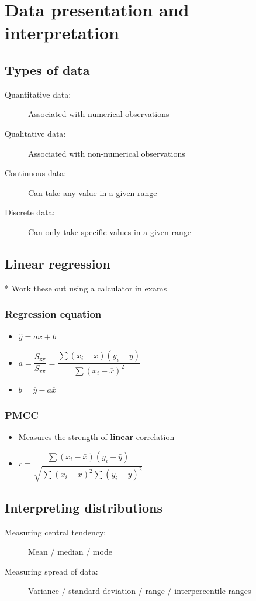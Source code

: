 \documentclass[A4paper, 11pt]{article}
\begin{document}
	\pagebreak
	
	\section{Data presentation and interpretation}
	\subsection{Types of data}
	\begin{description}
		\item[Quantitative data:] Associated with numerical observations
		\item[Qualitative data:] Associated with non-numerical observations
		\item[Continuous data:] Can take any value in a given range
		\item[Discrete data:] Can only take specific values in a given range
	\end{description}
	
	\subsection{Linear regression}
	* Work these out using a calculator in exams
	\subsubsection{Regression equation}
	\begin{itemize}
		\item $\hat{y}=ax+b$
		\item $a=\dfrac{S_{\mathrm{xy}}}{S_{\mathrm{xx}}}=\dfrac{\sum (x_i-\overline{x}) (y_i-\overline{y})}{\sum (x_i-\overline{x})^2}$
		\item $b=\overline{y}-a\overline{x}$
	\end{itemize}
	
	\subsubsection{PMCC}
	\begin{itemize}
		\item Measures the strength of \textbf{linear} correlation
		\item  $r =\dfrac{\sum\left(x_{i}-\bar{x}\right)\left(y_{i}-\bar{y}\right)}{\sqrt{\sum\left(x_{i}-\bar{x}\right)^{2} \sum\left(y_{i}-\bar{y}\right)^{2}}}$
	\end{itemize}
	
	\subsection{Interpreting distributions}
	\begin{description}
		\item[Measuring central tendency:] Mean / median / mode
		\item[Measuring spread of data:] Variance / standard deviation / range / interpercentile ranges
	
	\end{description}
	
\end{document}

